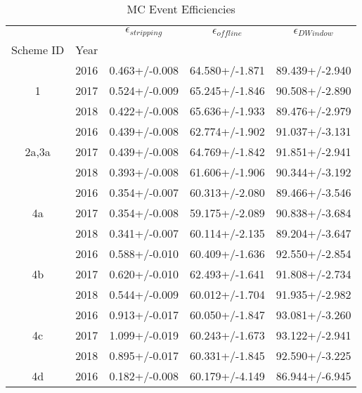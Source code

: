 \begin{table}
\centering
\caption{MC Event Efficiencies}
\label{tab:event_offdwin_1}
\begin{tabular}{ccccc}
\toprule
   &      & $\epsilon_{stripping}$ & $\epsilon_{offline}$ & $\epsilon_{D Window}$ \\
Scheme ID & Year &                        &                      &                       \\
\midrule
\multirow{3}{*}{1} & 2016 &          0.463+/-0.008 &       64.580+/-1.871 &        89.439+/-2.940 \\
   & 2017 &          0.524+/-0.009 &       65.245+/-1.846 &        90.508+/-2.890 \\
   & 2018 &          0.422+/-0.008 &       65.636+/-1.933 &        89.476+/-2.979 \\
\cline{1-5}
\multirow{3}{*}{2a,3a} & 2016 &          0.439+/-0.008 &       62.774+/-1.902 &        91.037+/-3.131 \\
   & 2017 &          0.439+/-0.008 &       64.769+/-1.842 &        91.851+/-2.941 \\
   & 2018 &          0.393+/-0.008 &       61.606+/-1.906 &        90.344+/-3.192 \\
\cline{1-5}
\multirow{3}{*}{4a} & 2016 &          0.354+/-0.007 &       60.313+/-2.080 &        89.466+/-3.546 \\
   & 2017 &          0.354+/-0.008 &       59.175+/-2.089 &        90.838+/-3.684 \\
   & 2018 &          0.341+/-0.007 &       60.114+/-2.135 &        89.204+/-3.647 \\
\cline{1-5}
\multirow{3}{*}{4b} & 2016 &          0.588+/-0.010 &       60.409+/-1.636 &        92.550+/-2.854 \\
   & 2017 &          0.620+/-0.010 &       62.493+/-1.641 &        91.808+/-2.734 \\
   & 2018 &          0.544+/-0.009 &       60.012+/-1.704 &        91.935+/-2.982 \\
\cline{1-5}
\multirow{3}{*}{4c} & 2016 &          0.913+/-0.017 &       60.050+/-1.847 &        93.081+/-3.260 \\
   & 2017 &          1.099+/-0.019 &       60.243+/-1.673 &        93.122+/-2.941 \\
   & 2018 &          0.895+/-0.017 &       60.331+/-1.845 &        92.590+/-3.225 \\
\cline{1-5}
\multirow{3}{*}{4d} & 2016 &          0.182+/-0.008 &       60.179+/-4.149 &        86.944+/-6.945 \\

\end{tabular}
\end{table}
